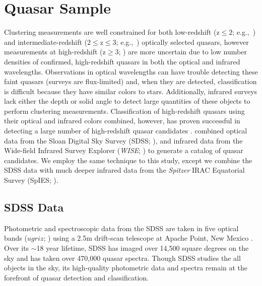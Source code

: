 \documentclass[onecolumn]{emulateapj}
\begin{document}
\clearpage

\section{Quasar Sample}\label{Data}
Clustering measurements are well constrained for both low-redshift (z$\le2$; e.g.,\ \citealt{Ross2009}) and intermediate-redshift ($2\le \mathrm{z}\le3$; e.g.,\ \citealt{Eftekharzadeh2015}) optically selected quasars, however measurements at high-redshift (z$\ge 3$; \citealt{Shen2007}) are more uncertain due to low number densities of confirmed, high-redshift quasars in both the optical and infrared wavelengths. Observations in optical wavelengths can have trouble detecting these faint quasars (surveys are flux-limited) and, when they are detected, classification is difficult because they have similar colors to stars. Additionally, infrared surveys lack either the depth or solid angle to detect large quantities of these objects to perform clustering measurements. Classification of high-redshift quasars using their optical and infrared colors combined, however,  has proven successful in detecting a large number of high-redshift quasar candidates \citep{Richards2015}. \citet{Richards2015} combined  optical data from the Sloan Digital Sky Survey (SDSS; \citealt{York2000}), and infrared data from the Wide-field Infrared Survey Explorer (\emph{WISE}; \citealt{Wright2010}) to generate a catalog of quasar candidates. We employ the same technique to this study, except we combine the SDSS data with much deeper infrared data from the \emph{Spitzer} IRAC Equatorial Survey (SpIES; \citealt{Timlin2016}).

\subsection{SDSS Data}
Photometric and spectroscopic data from the SDSS are taken in five optical bands ($ugriz$; \citealt{Fukugita1996}) using a 2.5m drift-scan telescope at Apache Point, New Mexico \citep{York2000}. Over its $\sim$18 year lifetime, SDSS has imaged over 14,500 square degrees on the sky and has taken over 470,000 quasar spectra. Though SDSS studies the all objects in the sky, its high-quality photometric data and spectra remain at the forefront of quasar detection and classification.
\end{document}
